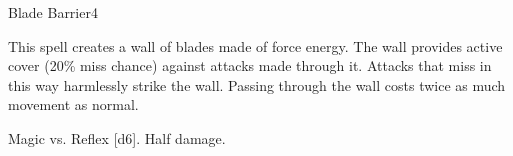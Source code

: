 \begin{spellsection}{Blade Barrier}{4}
\begin{spellheader}
\end{spellheader}
\begin{spellcontent}
    \begin{spelltargetinginfo}
    \end{spelltargetinginfo}
    \begin{spelleffects}
        \spelleffect This spell creates a wall of blades made of force energy. The wall provides active cover (20\% miss chance) against attacks made through it. Attacks that miss in this way harmlessly strike the wall. Passing through the wall costs twice as much movement as normal.
        \spelldur \durshort \dismissable
    \end{spelleffects}
\end{spellcontent}
\begin{spellsubcontent}
    \begin{spelltargetinginfo}
    \end{spelltargetinginfo}
    \begin{spelleffects}
        \begin{spellattack}{Magic vs. Reflex}
            \spellsuccess {}[d6].
            \spellfailure Half damage.
        \end{spellattack}
    \end{spelleffects}
\end{spellsubcontent}
\begin{spellfooter}
\end{spellfooter}
\end{spellsection}

